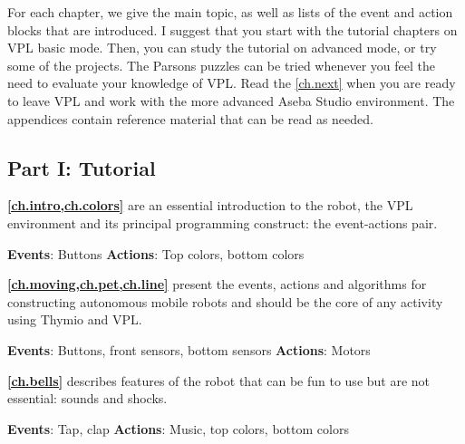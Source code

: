 

For each chapter, we give the main topic, as well as lists of the event
and action blocks that are introduced. I suggest that you start with the
tutorial chapters on VPL basic mode. Then, you can study the tutorial on
advanced mode, or try some of the projects. The Parsons puzzles can be
tried whenever you feel the need to evaluate your knowledge of VPL.
Read the \cref{ch.next} when you are ready to leave VPL and work with
the more advanced Aseba Studio environment. The appendices contain
reference material that can be read as needed.

\subsection*{Part I: Tutorial}

\textbf{\cref{ch.intro,ch.colors}} are an essential
introduction to the robot, the VPL environment and its principal
programming construct: the event-actions pair.

\textbf{Events}: Buttons \hfill \textbf{Actions}: Top colors, bottom colors

 \hfill {} \quad {}

\medskip

\textbf{\cref{ch.moving,ch.pet,ch.line}} present the events,
actions and algorithms for constructing autonomous mobile robots and
should be the core of any activity using Thymio and VPL.

\textbf{Events}: Buttons, front sensors, bottom sensors \hfill
\textbf{Actions}: Motors

 \quad{}\quad {} \hfill
{}

\medskip

\textbf{\cref{ch.bells}} describes features of the robot that can
be fun to use but are not essential: sounds and shocks.

\textbf{Events}: Tap, clap \hfill \textbf{Actions}: Music, top colors,
bottom colors

 \quad {} \hfill {}
\quad {} \quad {}

\medskip


